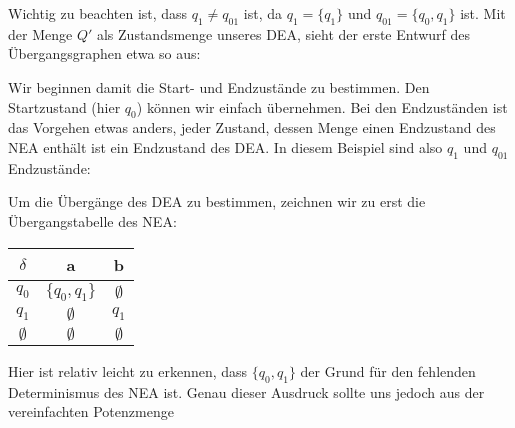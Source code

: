 \begin{flushleft}
    Wichtig zu beachten ist, dass $q_1 \neq q_{01}$ ist, da $q_1=\{q_1\}$ und $q_{01}=\{q_0,q_1\}$ ist.
    Mit der Menge $Q'$ als Zustandsmenge unseres DEA, sieht der erste Entwurf des Übergangsgraphen etwa so aus:
    \begin{center}
    \end{center}
    Wir beginnen damit die Start- und Endzustände zu bestimmen. Den Startzustand (hier $q_0$) können 
    wir einfach übernehmen. Bei den Endzuständen ist das Vorgehen etwas anders, jeder Zustand, dessen Menge 
    einen Endzustand des NEA enthält ist ein Endzustand des DEA. In diesem Beispiel sind also $q_1$ und $q_{01}$
    Endzustände:
    \begin{center}
    \end{center}
    Um die Übergänge des DEA zu bestimmen, zeichnen wir zu erst die Übergangstabelle des NEA:
    \begin{center}
        \begin{tabular}{|c|c|c|}
            \hline
            $\delta$ & a & b \\
            \hline
            $q_0$ & $\{q_0,q_1\}$ & $\emptyset$ \\
            \hline
            $q_1$ & $\emptyset$ & $q_1$ \\
            \hline
            $\emptyset$ & $\emptyset$ & $\emptyset$ \\
            \hline
        \end{tabular}
    \end{center}
    Hier ist relativ leicht zu erkennen, dass $\{q_0,q_1\}$ der Grund für den fehlenden 
    Determinismus des NEA ist. Genau dieser Ausdruck sollte uns jedoch aus der vereinfachten Potenzmenge 

\end{flushleft}
